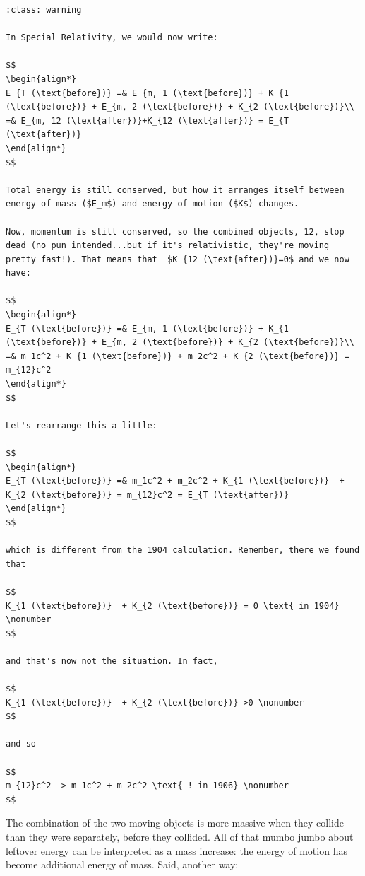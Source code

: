 \documentclass[
]{article}
\begin{document}
\begin{verbatim}
:class: warning

In Special Relativity, we would now write:

$$
\begin{align*}
E_{T (\text{before})} =& E_{m, 1 (\text{before})} + K_{1 (\text{before})} + E_{m, 2 (\text{before})} + K_{2 (\text{before})}\\
=& E_{m, 12 (\text{after})}+K_{12 (\text{after})} = E_{T (\text{after})}
\end{align*}
$$

Total energy is still conserved, but how it arranges itself between energy of mass ($E_m$) and energy of motion ($K$) changes.

Now, momentum is still conserved, so the combined objects, 12, stop dead (no pun intended...but if it's relativistic, they're moving pretty fast!). That means that  $K_{12 (\text{after})}=0$ and we now have:

$$
\begin{align*}
E_{T (\text{before})} =& E_{m, 1 (\text{before})} + K_{1 (\text{before})} + E_{m, 2 (\text{before})} + K_{2 (\text{before})}\\
=& m_1c^2 + K_{1 (\text{before})} + m_2c^2 + K_{2 (\text{before})} = m_{12}c^2
\end{align*}
$$

Let's rearrange this a little:

$$
\begin{align*}
E_{T (\text{before})} =& m_1c^2 + m_2c^2 + K_{1 (\text{before})}  + K_{2 (\text{before})} = m_{12}c^2 = E_{T (\text{after})}
\end{align*}
$$

which is different from the 1904 calculation. Remember, there we found that

$$
K_{1 (\text{before})}  + K_{2 (\text{before})} = 0 \text{ in 1904} \nonumber
$$

and that's now not the situation. In fact,

$$
K_{1 (\text{before})}  + K_{2 (\text{before})} >0 \nonumber
$$

and so

$$
m_{12}c^2  > m_1c^2 + m_2c^2 \text{ ! in 1906} \nonumber
$$
\end{verbatim}

The combination of the two moving objects is more massive when they
collide than they were separately, before they collided. All of that
mumbo jumbo about leftover energy can be interpreted as a mass increase:
the energy of motion has become additional energy of mass. Said, another
way:
\end{document}
